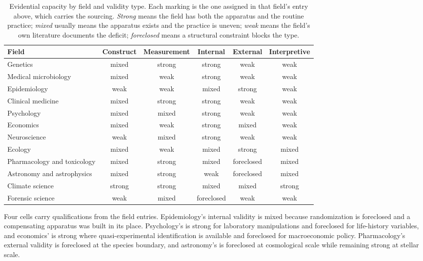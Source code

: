 \documentclass{article}
\newcommand{\tighttable}{\setlength{\tabcolsep}{4pt}\renewcommand{\arraystretch}{1.05}}
\begin{document}
\begin{table}[H]
\centering\small
\caption{Evidential capacity by field and validity type. Each marking is the one assigned in that field's entry above, which carries the sourcing. \emph{Strong} means the field has both the apparatus and the routine practice; \emph{mixed} usually means the apparatus exists and the practice is uneven; \emph{weak} means the field's own literature documents the deficit; \emph{foreclosed} means a structural constraint blocks the type.}
\label{tab:field-validity}
\tighttable
\begin{tabular}{@{}lccccc@{}}
\toprule
Field & Construct & Measurement & Internal & External & Interpretive \\
\midrule
Genetics & mixed & strong & strong & weak & weak \\
Medical microbiology & mixed & weak & strong & weak & weak \\
Epidemiology & weak & weak & mixed & strong & weak \\
Clinical medicine & mixed & strong & strong & weak & weak \\
Psychology & mixed & mixed & strong & weak & weak \\
Economics & mixed & weak & strong & mixed & weak \\
Neuroscience & weak & mixed & strong & weak & weak \\
Ecology & mixed & weak & mixed & strong & mixed \\
Pharmacology and toxicology & mixed & strong & mixed & foreclosed & mixed \\
Astronomy and astrophysics & mixed & strong & weak & foreclosed & mixed \\
Climate science & strong & strong & mixed & mixed & strong \\
Forensic science & weak & mixed & foreclosed & weak & weak \\
\bottomrule
\end{tabular}
\end{table}

Four cells carry qualifications from the field entries. Epidemiology's internal validity is mixed because randomization is foreclosed and a compensating apparatus was built in its place. Psychology's is strong for laboratory manipulations and foreclosed for life-history variables, and economics' is strong where quasi-experimental identification is available and foreclosed for macroeconomic policy. Pharmacology's external validity is foreclosed at the species boundary, and astronomy's is foreclosed at cosmological scale while remaining strong at stellar scale.
\end{document}
